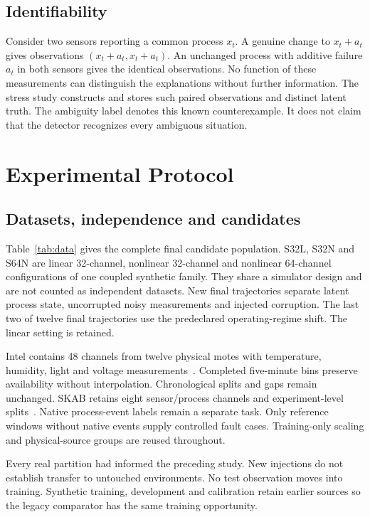 \documentclass[conference]{IEEEtran}
\newcommand{\1}{\mathbf{1}}
\begin{document}
\subsection{Identifiability}
Consider two sensors reporting a common process $x_t$. A genuine change to $x_t+a_t$ gives observations $(x_t+a_t,x_t+a_t)$. An unchanged process with additive failure $a_t$ in both sensors gives the identical observations. No function of these measurements can distinguish the explanations without further information. The stress study constructs and stores such paired observations and distinct latent truth. The ambiguity label denotes this known counterexample. It does not claim that the detector recognizes every ambiguous situation.

\section{Experimental Protocol}
\subsection{Datasets, independence and candidates}
Table~\ref{tab:data} gives the complete final candidate population. S32L, S32N and S64N are linear 32-channel, nonlinear 32-channel and nonlinear 64-channel configurations of one coupled synthetic family. They share a simulator design and are not counted as independent datasets. New final trajectories separate latent process state, uncorrupted noisy measurements and injected corruption. The last two of twelve final trajectories use the predeclared operating-regime shift. The linear setting is retained.

Intel contains 48 channels from twelve physical motes with temperature, humidity, light and voltage measurements~\cite{intel}. Completed five-minute bins preserve availability without interpolation. Chronological splits and gaps remain unchanged. SKAB retains eight sensor/process channels and experiment-level splits~\cite{skab}. Native process-event labels remain a separate task. Only reference windows without native events supply controlled fault cases. Training-only scaling and physical-source groups are reused throughout.

Every real partition had informed the preceding study. New injections do not establish transfer to untouched environments. No test observation moves into training. Synthetic training, development and calibration retain earlier sources so the legacy comparator has the same training opportunity.
\end{document}
